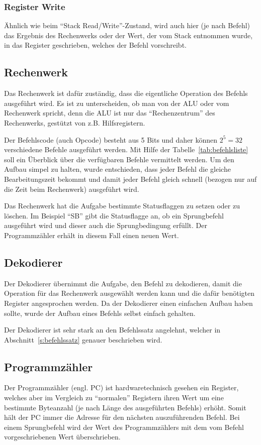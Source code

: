 \subsubsection{Register Write}
Ähnlich wie beim "`Stack Read/Write"'-Zustand, wird auch hier (je nach Befehl) das
Ergebnis des Rechenwerks oder der Wert, der vom Stack entnommen wurde, in das
Register geschrieben, welches der Befehl vorschreibt.
\subsection{Rechenwerk}
\label{s:alu}
Das Rechenwerk ist dafür zuständig, dass die eigentliche Operation des Befehls
ausgeführt wird. Es ist zu unterscheiden, ob man von der \ac{ALU} oder vom
Rechenwerk spricht, denn die \ac{ALU} ist nur das "`Rechenzentrum"' des
Rechenwerks, gestützt von z.B. Hilfsregistern.

Der Befehlscode (auch Opcode) besteht aus 5 Bits und daher können $2^{5} = 32$
verschiedene Befehle ausgeführt werden. Mit Hilfe der
Tabelle~\ref{tab:befehlsliste} soll ein Überblick über die verfügbaren Befehle
vermittelt werden. Um den Aufbau simpel zu halten, wurde entschieden, dass jeder
Befehl die gleiche Bearbeitungszeit bekommt und damit jeder Befehl gleich
schnell (bezogen nur auf die Zeit beim Rechenwerk) ausgeführt wird.

Das Rechenwerk hat die Aufgabe bestimmte Statusflaggen zu setzen oder zu
löschen. Im Beispiel "`SB"' gibt die Statusflagge an, ob ein Sprungbefehl
ausgeführt wird und dieser auch die Sprungbedingung erfüllt. Der Programmzähler
erhält in diesem Fall einen neuen Wert.
\clearpage
\pagebreak
\subsection{Dekodierer}
\label{s:decode}
Der Dekodierer übernimmt die Aufgabe, den Befehl zu dekodieren, damit die
Operation für das Rechenwerk ausgewählt werden kann und die dafür benötigten
Register angesprochen werden. Da der Dekodierer einen einfachen Aufbau haben
sollte, wurde der Aufbau eines Befehls selbst einfach gehalten.

Der Dekodierer ist sehr stark an den Befehlssatz angelehnt, welcher in
Abschnitt~\ref{s:befehlssatz} genauer beschrieben wird.
\subsection{Programmzähler}
\label{s:pc}
Der Programmzähler (engl. \ac{PC}) ist hardwaretechnisch gesehen ein Register,
welches aber im Vergleich zu "`normalen"' Registern ihren Wert um eine bestimmte
Byteanzahl (je nach Länge des ausgeführten Befehls) erhöht. Somit hält der \ac{PC}
immer die Adresse für den nächsten auszuführenden Befehl. Bei einem Sprungbefehl
wird der Wert des Programmzählers mit dem vom Befehl vorgeschriebenen Wert
überschrieben.

